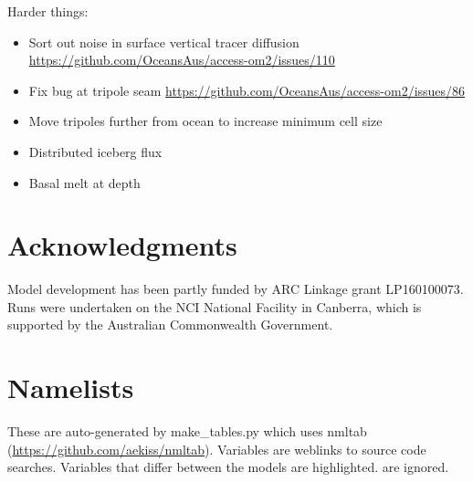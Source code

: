 \documentclass[11pt]{article}
\newcommand{\nmldiffer}[1]{#1} %
\newcommand{\nmllink}[2]{#1} %
\newcommand{\nml}[1]{{\footnotesize\textsf{}}}
\newlength{\nmllen}\setlength{\nmllen}{8ex}
\begin{document}
Harder things:
\begin{itemize}
\item Sort out noise in surface vertical tracer diffusion \url{https://github.com/OceansAus/access-om2/issues/110}
\item Fix bug at tripole seam \url{https://github.com/OceansAus/access-om2/issues/86}
\item Move tripoles further from ocean to increase minimum cell size
\item Distributed iceberg flux
\item Basal melt at depth
\end{itemize}
 
 \newpage
 
 \section{Acknowledgments}
Model development has been partly funded by ARC Linkage grant LP160100073.
Runs were undertaken on the NCI National Facility in Canberra, which is supported by the Australian Commonwealth Government.

\appendix
\section{Namelists}\label{S:namelists}


\renewcommand{\nmldiffer}[1]{\colorbox{hilite}{#1}}\setlength{\fboxsep}{0pt} %
\renewcommand{\nmllink}[2]{#1} %
\renewcommand{\nml}[1]{{\small\textsf{}}} %

These are auto-generated by make\_tables.py which uses nmltab (\url{https://github.com/aekiss/nmltab}).
Variables are weblinks to source code searches. 
Variables that differ between the models are \nmldiffer{\textcolor{link}{highlighted}}.
 are ignored. %
\end{document}
